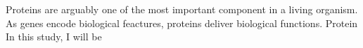 Proteins are arguably one of the most important component in a living organism. As genes encode biological feactures, proteins deliver biological functions. Protein  In this study, I will be 
